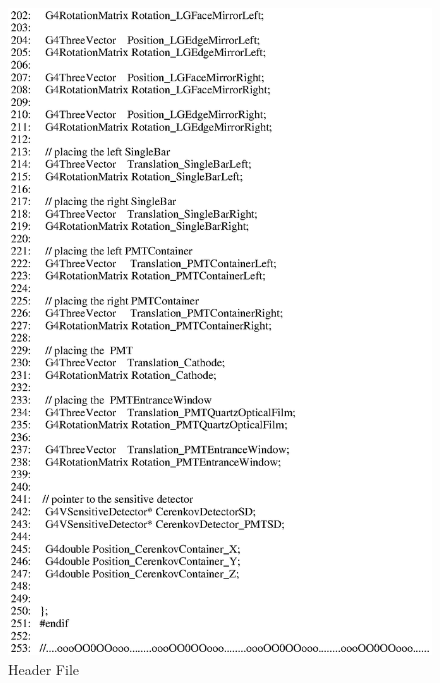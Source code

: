 \begin{figure}[ht]
  \hspace{0cm}
  \includegraphics[scale=0.8]{./figures5/QweakSimCerenkovDetector.hh-p4.eps}
  \caption{Header File}
           \label{fig:V-SC-4}
\end{figure}
\clearpage

